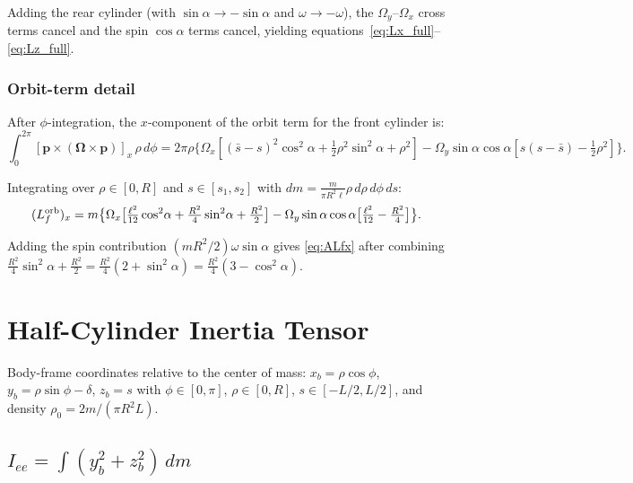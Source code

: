 \documentclass[11pt]{article}
\newcommand{\vect}[1]{\bm{#1}}
\begin{document}
Adding the rear cylinder (with $\sin\alpha\to-\sin\alpha$ and
$\omega\to-\omega$), the $\Omega_y$--$\Omega_x$ cross terms cancel
and the spin $\cos\alpha$ terms cancel, yielding
equations~\eqref{eq:Lx_full}--\eqref{eq:Lz_full}.

\subsubsection{Orbit-term detail}
\label{app:full_orbit_detail}

After $\phi$-integration, the $x$-component of the orbit term for the
front cylinder is:
\begin{equation}
\int_0^{2\pi}[\vect{p}\times(\vect{\Omega}\times\vect{p})]_x\,\rho\,d\phi
= 2\pi\rho\bigl\{
\Omega_x[(\bar{s}-s)^2\cos^2\!\alpha+\tfrac{1}{2}\rho^2\sin^2\!\alpha+\rho^2]
-\Omega_y\sin\alpha\cos\alpha[s(s-\bar{s})-\tfrac{1}{2}\rho^2]
\bigr\}.
\end{equation}

Integrating over $\rho\in[0,R]$ and $s\in[s_1,s_2]$ with
$dm=\frac{m}{\pi R^2\ell}\rho\,d\rho\,d\phi\,ds$:
\begin{align}
(L_f^{\rm orb})_x
&= m\bigl\{
\Omega_x\bigl[\tfrac{\ell^2}{12}\cos^2\!\alpha
+\tfrac{R^2}{4}\sin^2\!\alpha+\tfrac{R^2}{2}\bigr]
-\Omega_y\sin\alpha\cos\alpha\bigl[\tfrac{\ell^2}{12}
-\tfrac{R^2}{4}\bigr]\bigr\}.
\end{align}

Adding the spin contribution $(mR^2/2)\omega\sin\alpha$ gives
\eqref{eq:ALfx} after combining $\tfrac{R^2}{4}\sin^2\!\alpha
+\tfrac{R^2}{2}=\tfrac{R^2}{4}(2+\sin^2\!\alpha)
=\tfrac{R^2}{4}(3-\cos^2\!\alpha)$.

\section{Half-Cylinder Inertia Tensor}
\label{app:half_inertia}

Body-frame coordinates relative to the center of mass:
$x_b=\rho\cos\phi$, $y_b=\rho\sin\phi-\delta$, $z_b=s$ with
$\phi\in[0,\pi]$, $\rho\in[0,R]$, $s\in[-L/2,L/2]$, and density
$\rho_0=2m/(\pi R^2 L)$.

\subsection{$I_{ee}=\int(y_b^2+z_b^2)\,dm$}
\end{document}
